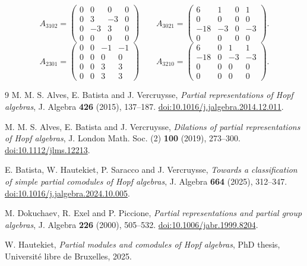 \documentclass[11pt]{amsart}
\theoremstyle{definition}
\begin{document}
\[
A_{3102}=\begin{pmatrix}0 & 0 & 0 & 0 \\ 0 & 3 & -3 & 0 \\ 0 & -3 & 3 & 0 \\ 0 & 0 & 0 & 0\end{pmatrix}\qquad A_{3021}=\begin{pmatrix}6 & 1 & 0 & 1 \\ 0 & 0 & 0 & 0 \\ -18 & -3 & 0 & -3 \\ 0 & 0 & 0 & 0\end{pmatrix}.
\]
\[
A_{2301}=\begin{pmatrix}0 & 0 & -1 & -1 \\ 0 & 0 & 0 & 0 \\ 0 & 0 & 3 & 3 \\ 0 & 0 & 3 & 3\end{pmatrix}\qquad A_{3210}=\begin{pmatrix}6 & 0 & 1 & 1 \\ -18 & 0 & -3 & -3 \\ 0 & 0 & 0 & 0 \\ 0 & 0 & 0 & 0\end{pmatrix}.
\]

\begin{thebibliography}{9}
 M. M. S. Alves, E. Batista and J. Vercruysse,
\emph{Partial representations of Hopf algebras},
J. Algebra \textbf{426} (2015), 137--187.
\href{https://doi.org/10.1016/j.jalgebra.2014.12.011}{doi:10.1016/j.jalgebra.2014.12.011}.

 M. M. S. Alves, E. Batista and J. Vercruysse,
\emph{Dilations of partial representations of Hopf algebras},
J. London Math. Soc. (2) \textbf{100} (2019), 273--300.
\href{https://doi.org/10.1112/jlms.12213}{doi:10.1112/jlms.12213}.

 E. Batista, W. Hautekiet, P. Saracco and J. Vercruysse,
\emph{Towards a classification of simple partial comodules of Hopf algebras},
J. Algebra \textbf{664} (2025), 312--347.
\href{https://doi.org/10.1016/j.jalgebra.2024.10.005}{doi:10.1016/j.jalgebra.2024.10.005}.

 M. Dokuchaev, R. Exel and P. Piccione,
\emph{Partial representations and partial group algebras},
J. Algebra \textbf{226} (2000), 505--532.
\href{https://doi.org/10.1006/jabr.1999.8204}{doi:10.1006/jabr.1999.8204}.

 W. Hautekiet, \emph{Partial modules and comodules of Hopf algebras},
PhD thesis, Universit\'e libre de Bruxelles, 2025.
\end{thebibliography}
\end{document}
